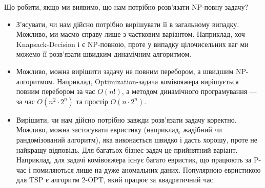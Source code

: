 \documentclass[12pt,a4paper]{report}
\begin{document}
Що робити, якщо ми виявимо, що нам потрібно розв’язати NP-повну задачу?

\begin{itemize}
    \item З’ясувати, чи нам дійсно потрібно вирішувати її в загальному випадку. Можливо, ми маємо справу лише з частковим варіантом. Наприклад, хоч Knapsack-Decision і є NP-повною, проте у випадку цілочисельних ваг ми можемо її розв’язати швидким динамічним алгоритмом.
    \item Можливо, можна вирішити задачу не повним перебором, а швидшим NP-алгоритмом. Наприклад, Optimization-задача комівояжера вирішується повним перебором за час \(O(n!)\), а методом динамічного програмування --- за час \(O(n ^ 2 \cdot 2 ^ n)\) та простір \(O(n \cdot 2 ^ n)\).
    \item Вирішити, чи нам дійсно потрібно завжди розв’язати задачу коректно. Можливо, можна застосувати евристику (наприклад, жадібний чи рандомізований алгоритм), яка виконається швидко і дасть хорошу, проте не найкращу відповідь. Для багатьох бізнес-задач це прийнятний варіант. Наприклад, для задачі комівояжера існує багато евристик, що працюють за P-час і помиляються лише на дуже аномальних даних. Популярною евристикою для TSP є алгоритм 2-OPT, який працює за квадратичний час.
\end{itemize}
\end{document}

